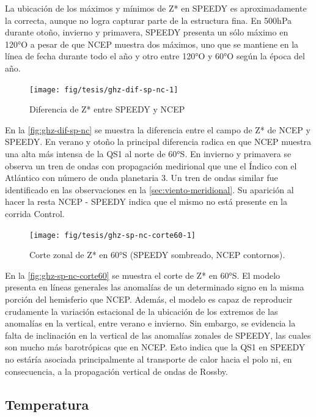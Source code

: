 \documentclass[spanish,a4paper,12pt,oneside]{book}
\begin{document}
La ubicación de los máximos y mínimos de Z* en SPEEDY es aproximadamente
la correcta, aunque no logra capturar parte de la estructura fina. En
500hPa durante otoño, invierno y primavera, SPEEDY presenta un sólo
máximo en 120°O a pesar de que NCEP muestra dos máximos, uno que se
mantiene en la línea de fecha durante todo el año y otro entre 120°O y
60°O según la época del año.

\begin{landscape}\begin{figure}

{\centering \texttt{[image: fig/tesis/ghz-dif-sp-nc-1]} 

}

\caption{Diferencia de Z* entre SPEEDY y NCEP}\label{fig:ghz-dif-sp-nc}
\end{figure}
\end{landscape}

En la \autoref{fig:ghz-dif-sp-nc} se muestra la diferencia entre el
campo de Z* de NCEP y SPEEDY. En verano y otoño la principal diferencia
radica en que NCEP muestra una alta más intensa de la QS1 al norte de
60°S. En invierno y primavera se observa un tren de ondas con
propagación medirional que une el Índico con el Atlántico con número de
onda planetaria 3. Un tren de ondas similar fue identificado en las
observaciones en la \autoref{sec:viento-meridional}. Su aparición al
hacer la resta NCEP - SPEEDY indica que el mismo no está presente en la
corrida Control.

\begin{figure}
\texttt{[image: fig/tesis/ghz-sp-nc-corte60-1]} \caption{Corte zonal de Z* en 60°S (SPEEDY sombreado, NCEP contornos).}\label{fig:ghz-sp-nc-corte60}
\end{figure}

En la \autoref{fig:ghz-sp-nc-corte60} se muestra el corte de Z* en 60°S.
El modelo presenta en líneas generales las anomalías de un determinado
signo en la misma porción del hemisferio que NCEP. Además, el modelo es
capaz de reproducir crudamente la variación estacional de la ubicación
de los extremos de las anomalías en la vertical, entre verano e
invierno. Sin embargo, se evidencia la falta de inclinación en la
vertical de las anomalías zonales de SPEEDY, las cuales son mucho más
barotrópicas que en NCEP. Esto indica que la QS1 en SPEEDY no estáría
asociada principalmente al transporte de calor hacia el polo ni, en
consecuencia, a la propagación vertical de ondas de Rossby.

\subsection{Temperatura}\label{temperatura-1}
\end{document}
